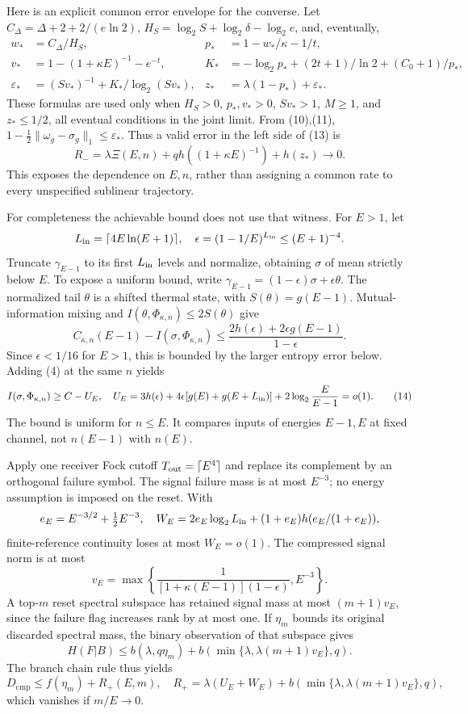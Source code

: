 \documentclass[11pt]{article}
\newcommand{\cmp}{\mathrm{cmp}}
\newcommand{\PhiT}{\Phi_{\kappa,n}}
\begin{document}
Here is an explicit common error envelope for the converse.
Let \(C_\Delta=\Delta+2+2/(e\ln2)\),
\(H_S=\log_2S+\log_2\delta-\log_2e\), and, eventually,
\[
\begin{aligned}
 w_*&=C_\Delta/H_S,& p_*&=1-w_*/\kappa-1/t,\\
 v_*&=1-(1+\kappa E)^{-1}-e^{-t},&
 K_*&=-\log_2p_*+(2t+1)/\ln2+(C_0+1)/p_*,\\
 \varepsilon_*&=(Sv_*)^{-1}+K_*/\log_2(Sv_*),&
 z_*&=\lambda(1-p_*)+\varepsilon_* .
\end{aligned}
\]
These formulas are used only when \(H_S>0\), \(p_*,v_*>0\),
\(Sv_*>1\), \(M\ge1\), and \(z_*\le1/2\), all eventual
conditions in the joint limit. From (10),(11),
\(1-\tfrac12\|\omega_g-\sigma_g\|_1\le\varepsilon_*\).
Thus a valid error in the left side of (13) is
\[
 R_-=\lambda\Xi(E,n)+qh((1+\kappa E)^{-1})+h(z_*)\longrightarrow0.
 \tag{13a}
\]
This exposes the dependence on \(E,n\), rather than assigning a common
rate to every unspecified sublinear trajectory.

For completeness the achievable bound does not use that witness.
For \(E>1\), let
\[
 L_{\rm in}=\lceil4E\ln(E+1)\rceil,\quad
 \epsilon=(1-1/E)^{L_{\rm in}}\le(E+1)^{-4}.
\]
Truncate \(\gamma_{E-1}\) to its first \(L_{\rm in}\) levels and normalize,
obtaining \(\sigma\) of mean strictly below \(E\).
To expose a uniform bound, write
\(\gamma_{E-1}=(1-\epsilon)\sigma+\epsilon\theta\).
The normalized tail \(\theta\) is a shifted thermal state, with
\(S(\theta)=g(E-1)\). Mutual-information mixing and
\(I(\theta,\PhiT)\le2S(\theta)\) give
\[
 C_{\kappa,n}(E-1)-I(\sigma,\PhiT)
 \le\frac{2h(\epsilon)+2\epsilon g(E-1)}{1-\epsilon}.
\]
Since \(\epsilon<1/16\) for \(E>1\), this is bounded by the larger
entropy error below. Adding (4) at the same \(n\) yields
\[
 I(\sigma,\PhiT)\ge C-U_E,\quad
 U_E=3h(\epsilon)+4\epsilon[g(E)+g(E+L_{\rm in})]
                         +2\log_2\frac E{E-1}=o(1).         \tag{14}
\]
The bound is uniform for \(n\le E\). It compares inputs of energies
\(E-1,E\) at fixed channel, not \(n(E-1)\) with \(n(E)\).

Apply one receiver Fock cutoff \(T_{\rm out}=\lceil E^4\rceil\)
and replace its complement by an orthogonal failure symbol.
The signal failure mass is at most \(E^{-3}\); no energy assumption
is imposed on the reset. With
\[
 e_E=E^{-3/2}+\tfrac12E^{-3},\quad
 W_E=2e_E\log_2L_{\rm in}
       +(1+e_E)h(e_E/(1+e_E)),
\]
finite-reference continuity \cite[Lemma~2]{winter} loses at most
\(W_E=o(1)\). The compressed signal norm is at most
\[
 v_E=\max\left\{\frac1{[1+\kappa(E-1)](1-\epsilon)},E^{-3}\right\}.
\]
A top-\(m\) reset spectral subspace has retained signal mass at most
\((m+1)v_E\), since the failure flag increases rank by at most one.
If \(\eta_m\) bounds its original discarded spectral mass, the binary
observation of that subspace gives
\[
 H(F|B)\le b(\lambda,q\eta_m)
       +b(\min\{\lambda,\lambda(m+1)v_E\},q).
\]
The branch chain rule thus yields
\[
 D_{\cmp}\le f(\eta_m)+R_+(E,m),\quad
 R_+=\lambda(U_E+W_E)+
          b(\min\{\lambda,\lambda(m+1)v_E\},q),               \tag{15}
\]
which vanishes if \(m/E\to0\).
\end{document}
